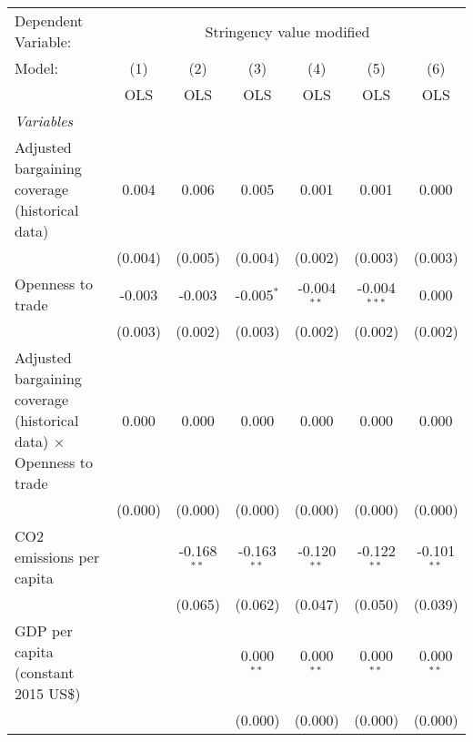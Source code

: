 
\begingroup
\centering
\begin{tabular}{lcccccc}
   \toprule
   Dependent Variable: & \multicolumn{6}{c}{Stringency value modified}\\
   Model:                                                                     & (1)     & (2)           & (3)           & (4)           & (5)            & (6)\\  
                                                                              &  OLS    & OLS           & OLS           & OLS           & OLS            & OLS\\  
   \midrule
   \emph{Variables}\\
   Adjusted bargaining coverage (historical data)                             & 0.004   & 0.006         & 0.005         & 0.001         & 0.001          & 0.000\\   
                                                                              & (0.004) & (0.005)       & (0.004)       & (0.002)       & (0.003)        & (0.003)\\   
   Openness to trade                                                          & -0.003  & -0.003        & -0.005$^{*}$  & -0.004$^{**}$ & -0.004$^{***}$ & 0.000\\   
                                                                              & (0.003) & (0.002)       & (0.003)       & (0.002)       & (0.002)        & (0.002)\\   
   Adjusted bargaining coverage (historical data) $\times$ Openness to trade  & 0.000   & 0.000         & 0.000         & 0.000         & 0.000          & 0.000\\   
                                                                              & (0.000) & (0.000)       & (0.000)       & (0.000)       & (0.000)        & (0.000)\\   
   CO2 emissions per capita                                                   &         & -0.168$^{**}$ & -0.163$^{**}$ & -0.120$^{**}$ & -0.122$^{**}$  & -0.101$^{**}$\\   
                                                                              &         & (0.065)       & (0.062)       & (0.047)       & (0.050)        & (0.039)\\   
   GDP per capita (constant 2015 US\$)                                        &         &               & 0.000$^{**}$  & 0.000$^{**}$  & 0.000$^{**}$   & 0.000$^{**}$\\   
                                                                              &         &               & (0.000)       & (0.000)       & (0.000)        & (0.000)\\   

\end{tabular}
